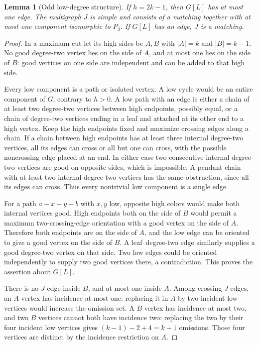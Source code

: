 \documentclass[11pt,a4paper]{article}
\newtheorem{lemma}[theorem]{Lemma}
\theoremstyle{definition}\newtheorem{definition}[theorem]{Definition}
\theoremstyle{remark}\newtheorem{remark}[theorem]{Remark}
\begin{document}
\begin{lemma}[Odd low-degree structure]\label{paired:odd-stability}
If $h=2k-1$, then $G[L]$ has at most one edge. The multigraph $J$ is
simple and consists of a matching together with at most one component
isomorphic to $P_3$. If $G[L]$ has an edge, $J$ is a matching.
\end{lemma}
\begin{proof}
In a maximum cut let its high sides be $A,B$ with $|A|=k$ and
$|B|=k-1$. No good degree-two vertex lies on the side of $A$, and at
most one lies on the side of $B$: good vertices on one side are
independent and can be added to that high side.

Every low component is a path or isolated vertex. A low cycle would
be an entire component of $G$, contrary to $h>0$. A low path with an
edge is either a chain of at least two degree-two vertices between
high endpoints, possibly equal, or a chain of degree-two vertices
ending in a leaf and attached at its other end to a high vertex.
Keep the high endpoints fixed and maximize crossing edges along a
chain. If a chain between high endpoints has at least three internal
degree-two vertices, all its edges can cross or all but one can cross,
with the possible noncrossing edge placed at an end. In either case
two consecutive internal degree-two vertices are good on opposite
sides, which is impossible. A pendant chain with at least two internal
degree-two vertices has the same obstruction, since all its edges can
cross. Thus every nontrivial low component is a single edge.

For a path $a-x-y-b$ with $x,y$ low, opposite high colors would make
both internal vertices good. High endpoints both on the side of $B$
would permit a maximum two-crossing-edge orientation with a good vertex
on the side of $A$. Therefore both endpoints are on the side of $A$,
and the low edge can be oriented to give a good vertex on the side of
$B$. A leaf--degree-two edge similarly supplies a good degree-two
vertex on that side. Two low edges could be oriented independently
to supply two good vertices there, a contradiction. This proves the
assertion about $G[L]$.

There is no $J$ edge inside $B$, and at most one inside $A$. Among
crossing $J$ edges, an $A$ vertex has incidence at most one: replacing
it in $A$ by two incident low vertices would increase the omission
set. A $B$ vertex has incidence at most two, and two $B$ vertices
cannot both have incidence two: replacing the two by their four
incident low vertices gives $(k-1)-2+4=k+1$ omissions. Those four
vertices are distinct by the incidence restriction on $A$.


\end{proof}
\end{document}
